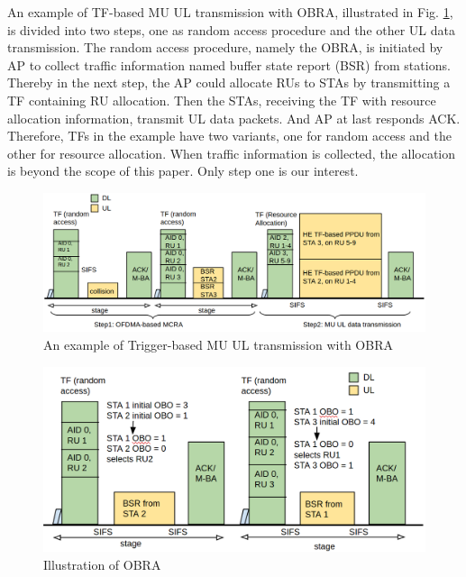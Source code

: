 \documentclass[journal]{IEEEtran}
\begin{document}
An example of TF-based MU UL transmission with OBRA, illustrated in Fig. \ref{fig_ra_ul}, is divided into two steps, one as random access procedure and the other UL data transmission.
The random access procedure, namely the OBRA, is initiated by AP to collect traffic information named buffer state report (BSR) from stations. 
Thereby in the next step, the AP could allocate RUs to STAs by transmitting a TF containing RU allocation.
Then the STAs, receiving the TF with resource allocation information, transmit UL data packets. And AP at last responds ACK.
Therefore, TFs in the example have two variants, one for random access and the other for resource allocation. 
When traffic information is collected, the allocation is beyond the scope of this paper. Only step one is our interest.
\begin{figure}[!t]
\centering
\includegraphics[scale=0.2]{./figure/Section_preliminary/fig_RA_UL.png}
\caption{An example of Trigger-based MU UL transmission with OBRA}
\label{fig_ra_ul}
\end{figure}
\begin{figure}[!t]
\centering
\includegraphics[scale=0.24]{./figure/Section_preliminary/fig_RA_illu.png}
\caption{Illustration of OBRA}
\label{fig_ra_illu}
\end{figure}
\end{document}
